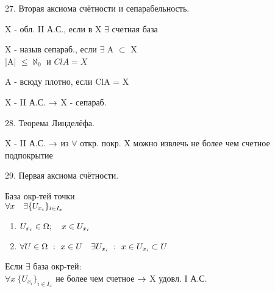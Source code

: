 \documentclass[11pt, fleqn]{article}
\begin{document}
    \begin{question}{27. Вторая аксиома счётности и сепарабельность.}
        \begin{definition} 
            X - обл. II А.С., если в X $\exists$ счетная база
        \end{definition}

        \begin{definition} 
            X - назыв сепараб., если $\exists$ A $\subset$ X\\
            |A| $\leq \aleph_0$ и $Cl A = X$
        \end{definition}

        \begin{definition} 
            A - всюду плотно, если ClA = X
        \end{definition}

        \begin{theorem} 
            X - II А.С. $\rightarrow$ X - сепараб.
        \end{theorem}
    \end{question}

    \begin{question}{28. Теорема Линделёфа.}
        \begin{theorem} 
            X - II А.С. $\rightarrow$ из $\forall$ откр. покр. X можно извлечь не более чем счетное подпокрытие
        \end{theorem}
    \end{question}

    \begin{question}{29. Первая аксиома счётности.}
        \begin{definition} 
            База окр-тей точки\\
            $\forall x \quad \exists \{U_{x_i}\}_{i \in I_x}$\\
            \begin{enumerate}
                \item $U_{x_i} \in \Omega; \quad x \in U_{x_i}$
                \item $\forall U \in \Omega \ : \ x \in U \quad \exists U_{x_i} \ : \ x \in U_{x_i} \subset U$
            \end{enumerate}
        \end{definition} 
        
        \begin{definition} 
            Если $\exists$  база окр-тей:\\
            $\forall x \ \{U_{x_i}\}_{i \in I_x}$ не более чем счетное $\rightarrow$ X удовл. I А.С.
        \end{definition}
    \end{question}
\end{document}
